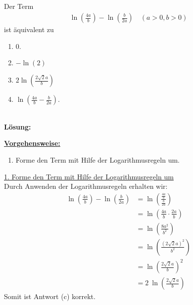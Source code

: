 \subsection*{}
Der Term
\begin{align*}
\ln \left( \frac{4a}{b} \right)
-
\ln \left( \frac{b}{2a} \right)
\quad
(a > 0 , b > 0)
\end{align*}
ist äquivalent zu
\renewcommand{\labelenumi}{(\alph{enumi})}
\begin{enumerate}
\item $0$.
\item $- \ln(2)$
\item $2  \ln \left( \frac{2 \sqrt{2}  a}{b} \right)$
\item $\ln \left( \frac{4  a}{b} - \frac{b}{2  a } \right)$.
\end{enumerate}
\ \\
\textbf{Lösung:}
\begin{mdframed}
\underline{\textbf{Vorgehensweise:}}
\renewcommand{\labelenumi}{\theenumi.}
\begin{enumerate}
\item Forme den Term mit Hilfe der Logarithmusregeln um.
\end{enumerate}
\end{mdframed}

\underline{1. Forme den Term mit Hilfe der Logarithmusregeln um}\\
Durch Anwenden der Logarithmusregeln erhalten wir:
\begin{align*}
\ln \left( \frac{4a}{b} \right)
-
\ln \left( \frac{b}{2a} \right)
&= 
\ln \left(\frac{\frac{4a}{b}}{\frac{b}{2a}} \right)\\
&= \ln \left( \frac{4a}{b} \cdot \frac{2a}{b} \right)\\
&= \ln \left( \frac{8  a^2}{b^2} \right)\\
&= \ln \left( \frac{( 2 \sqrt{2}  a)^2}{b^2} \right)\\
&= \ln \left( \frac{ 2 \sqrt{2}  a}{b} \right)^2\\
&= 2 \ \ln \left( \frac{ 2 \sqrt{2}  a}{b} \right)
\end{align*}
Somit ist Antwort (c) korrekt.

\newpage

